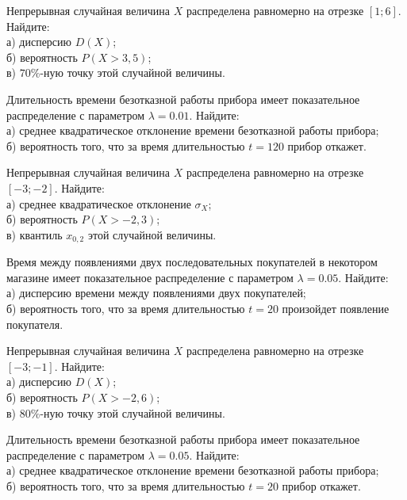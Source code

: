 \vfill

\newpage\setcounter{zad}{0}

\z Непрерывная случайная величина $X$ распределена равномерно на отрезке $[1; 6]$. Найдите: \\ \quad а) дисперсию $D(X)$; \\ \quad б) вероятность $P(X>3{,}5)$; \\ \quad в) $70\%$-ную точку этой случайной величины.


\vfill

\z Длительность времени безотказной работы прибора имеет показательное распределение с параметром $\lambda = 0.01$. Найдите: \\ \quad а) среднее квадратическое отклонение времени безотказной работы прибора; \\ \quad б) вероятность того, что за время длительностью $t = 120$ прибор  откажет.
 

\vfill

\newpage\setcounter{zad}{0}

\z Непрерывная случайная величина $X$ распределена равномерно на отрезке $[-3; -2]$. Найдите: \\ \quad а) среднее квадратическое отклонение $\sigma_X$; \\ \quad б) вероятность $P(X>-2{,}3)$; \\ \quad в) квантиль $x_{0{,}2}$ этой случайной величины.


\vfill

\z Время между появлениями двух последовательных покупателей в некотором магазине имеет показательное распределение с параметром $\lambda = 0.05$. Найдите: \\ \quad а) дисперсию времени между появлениями двух покупателей; \\ \quad б) вероятность того, что за время длительностью $t = 20$  произойдет появление покупателя.
 

\vfill

\newpage\setcounter{zad}{0}

\z Непрерывная случайная величина $X$ распределена равномерно на отрезке $[-3; -1]$. Найдите: \\ \quad а) дисперсию $D(X)$; \\ \quad б) вероятность $P(X>-2{,}6)$; \\ \quad в) $80\%$-ную точку этой случайной величины.


\vfill

\z Длительность времени безотказной работы прибора имеет показательное распределение с параметром $\lambda = 0.05$. Найдите: \\ \quad а) среднее квадратическое отклонение времени безотказной работы прибора; \\ \quad б) вероятность того, что за время длительностью $t = 20$ прибор  откажет.
 

